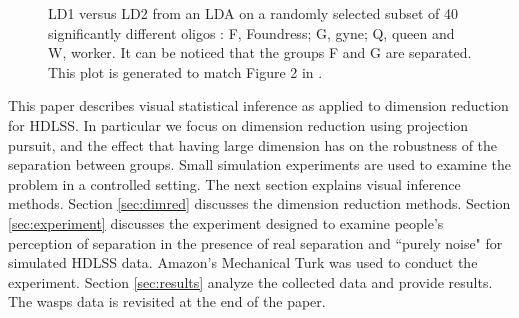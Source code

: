 \begin{figure}[hbtp]
   \centering
       \caption{LD1 versus LD2 from an LDA on a randomly selected subset of 40 significantly different oligos : F, Foundress; G, gyne; Q, queen and W, worker. It can be noticed that the groups F and G are separated. This plot is generated to match Figure 2 in \cite{toth:2010}. }
     \label{oligo}
\end{figure}  

This paper describes visual statistical inference as applied to dimension reduction for HDLSS. In particular we focus on dimension reduction using projection pursuit, and the effect that having large dimension has on the robustness of the separation between groups.  Small simulation experiments are used to examine the problem in a controlled setting. The next section explains visual inference methods. Section \ref{sec:dimred} discusses the dimension reduction methods. Section \ref{sec:experiment} discusses the experiment designed to examine people's perception of separation in the presence of real separation and ``purely noise" for simulated HDLSS data. Amazon's Mechanical Turk \citep{turk} was used to conduct the experiment. Section \ref{sec:results} analyze the collected data and provide results. The wasps data is revisited at the end of the paper. 

